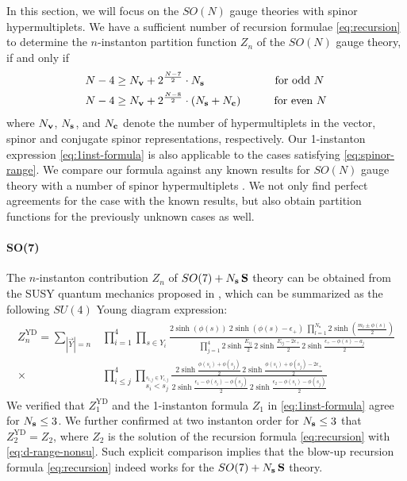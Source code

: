 \documentclass[letterpaper, 11pt]{article}
\def\e{\epsilon}
\begin{document}
{In this section, we will focus on the $SO(N)$ gauge theories with spinor hypermultiplets.
We have a sufficient number of recursion formulae \eqref{eq:recursion} to determine the $n$-instanton partition function $Z_n$ of the $SO(N)$ gauge theory, if and only if  
\begin{align}
  \label{eq:spinor-range}
  \begin{split}
  N-4 &\geq N_{\bf v} + 2^{\frac{N-7}{2}}\cdot N_{\bf s} \qquad\qquad\qquad \text{ for odd $N$}\\
  N-4 &\geq N_{\bf v} + 2^{\frac{N-8}{2}}\cdot (N_{\bf s} + N_{\bf c})\qquad\quad \text{for even $N$}
  \end{split}
\end{align}
where $N_{\bf v}$, $N_{\bf s}$, and $N_{\bf c}$ denote the number of hypermultiplets in the vector, spinor and conjugate spinor representations, respectively. Our 1-instanton expression \eqref{eq:1inst-formula} is also applicable to the cases satisfying \eqref{eq:spinor-range}. 
We compare our formula against any known results for $SO(N)$ gauge theory with a number of spinor hypermultiplets  \cite{Kim:2018gjo, DelZotto:2018tcj}. We not only find perfect agreements for the case with the known results, but also  obtain partition functions for the previously unknown cases as well. 

\paragraph{SO(7)} The $n$-instanton contribution $Z_n$ of $SO(7) + N_{\bf s}\,\mathbf{S}$ theory can be obtained from the SUSY quantum mechanics proposed in \cite{Kim:2018gjo}, which can be summarized as the following $SU(4)$ Young diagram expression:
\begin{align}
\begin{split}
  Z_n^\text{YD} = \sum_{|\vec{Y}| = n} &\prod_{i=1}^4\prod_{s \in Y_i}\frac{2\sinh{(\phi(s))} \ 2\sinh{(\phi(s)-\e_+)} \ \prod_{l=1}^{N_\textbf{s}}2\sinh(\frac{m_l \pm \phi(s)}{2}) }{\prod_{j=1}^4 2\sinh{\frac{E_{ij}}{2}}\,2\sinh{\frac{E_{ij}-2\e_+}{2}}\,2\sinh{\frac{\e_+ - \phi(s) - a_j}{2}}} \\ \times &\prod_{i \leq j}^4 \prod_{\stackrel{s_{i,j} \in Y_{i,j}}{s_i < s_j}} \frac{2\sinh{\frac{\phi(s_i)+\phi(s_j)}{2}}\, 2\sinh{\frac{\phi(s_i)+\phi(s_j)-2\e_+}{2}}}{ 2\sinh{\frac{\e_1 - \phi(s_i)-\phi(s_j)}{2}} \, 2\sinh{\frac{\e_2 - \phi(s_i)-\phi(s_j)}{2}}}
\end{split}
\end{align}
We verified that $Z_1^\text{YD}$ and the 1-instanton formula $Z_1$ in \eqref{eq:1inst-formula} agree for $N_{\bf s} \leq 3$. We further confirmed at two instanton order for $N_{\bf s} \leq 3$ that $Z_2^\text{YD} = Z_2$, where $Z_2$ is  the solution of the recursion formula \eqref{eq:recursion} with \eqref{eq:d-range-nonsu}. Such explicit comparison implies that the blow-up recursion formula \eqref{eq:recursion} indeed works for the $SO(7) + N_{\bf s}\,\mathbf{S}$ theory. 

}
\end{document}
